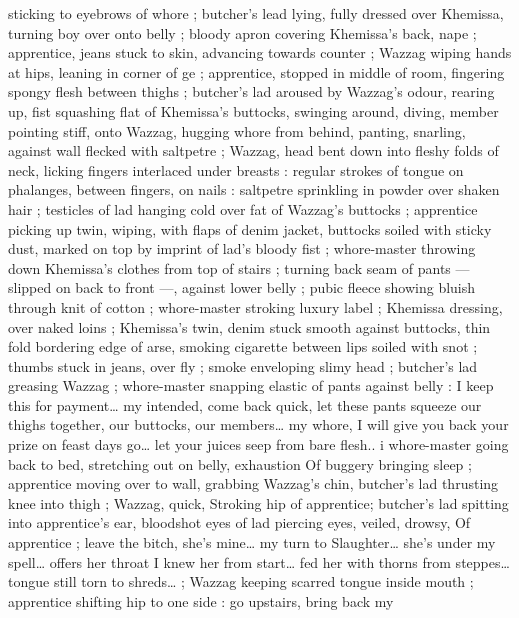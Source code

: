 sticking to eyebrows of whore ; butcher's lead lying, fully dressed 
over Khemissa, turning boy over onto belly ; bloody apron covering 
Khemissa's back, nape ; apprentice, jeans stuck to skin, advancing 
towards counter ; Wazzag wiping hands at hips, leaning in corner of 
ge ; apprentice, stopped in middle of room, fingering spongy 
flesh between thighs ; butcher's lad aroused by Wazzag's odour, 
rearing up, fist squashing flat of Khemissa's buttocks, swinging 
around, diving, member pointing stiff, onto Wazzag, hugging whore 
from behind, panting, snarling, against wall flecked with saltpetre ; 
Wazzag, head bent down into fleshy folds of neck, licking fingers 
interlaced under breasts : regular strokes of tongue on phalanges, 
between fingers, on nails : saltpetre sprinkling in powder over shaken 
hair ; testicles of lad hanging cold over fat of Wazzag's buttocks ; 
apprentice picking up twin, wiping, with flaps of denim jacket, 
buttocks soiled with sticky dust, marked on top by imprint of lad's 
bloody fist ; whore-master throwing down Khemissa's clothes from 
top of stairs ; turning back seam of pants --- slipped on back to front 
---, against lower belly ; pubic fleece showing bluish through knit of 
cotton ; whore-master stroking luxury label ; Khemissa dressing, over 
naked loins ; Khemissa's twin, denim stuck smooth against buttocks, 
thin fold bordering edge of arse, smoking cigarette between lips 
soiled with snot ; thumbs stuck in jeans, over fly ; smoke enveloping 
slimy head ; butcher's lad greasing Wazzag ; whore-master snapping 
elastic of pants against belly : {\gl}{\td} I keep this for payment{\ldots} my 
intended, come back quick, let these pants squeeze our thighs 
together, our buttocks, our members{\ldots} my whore, I will give you back 
your prize on feast days{\td} go{\ldots} let your juices seep from bare flesh..{\gr} 
i whore-master going back to bed, stretching out on belly, exhaustion 
Of buggery bringing sleep ; apprentice moving over to wall, grabbing 
Wazzag's chin, butcher's lad thrusting knee into thigh ; Wazzag, 
quick, Stroking hip of apprentice; butcher's lad spitting into 
apprentice's ear, bloodshot eyes of lad piercing eyes, veiled, drowsy, 
Of apprentice ; {\gl}{\td} leave the bitch, she's mine{\ldots} my turn to 
Slaughter{\ldots} she's under my spell{\ldots} offers her throat{\td} I knew her from 
start{\ldots} fed her with thorns from steppes{\ldots} tongue still torn to 
shreds{\ldots}{\gr} ; Wazzag keeping scarred tongue inside mouth ; 
apprentice shifting hip to one side : {\gl} go upstairs, bring back my 

